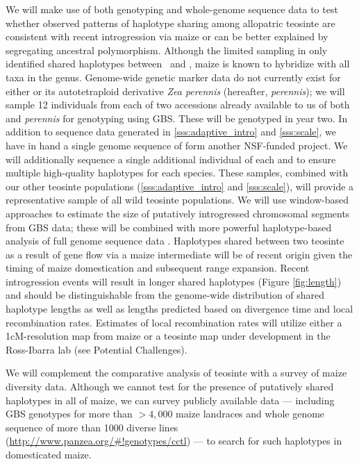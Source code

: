 We will make use of both genotyping and whole-genome sequence data to test whether observed patterns of haplotype sharing among allopatric teosinte are consistent with recent introgression via maize or can be better explained by segregating ancestral polymorphism.
Although the limited sampling in \citet{Ross-Ibarra2009a} only identified shared haplotypes between \zm\ and \zl, maize is known to hybridize with all taxa in the genus.
Genome-wide genetic marker data do not currently exist for either \zd{} or its autotetraploid derivative \emph{Zea perennis} (hereafter, \emph{perennis}); we will sample 12 individuals from each of two accessions already available to us of both \zd{} and \emph{perennis} for genotyping using GBS. 
These will be genotyped in year two.
In addition to sequence data generated in \ref{sss:adaptive_intro} and \ref{sss:scale}, we have in hand a single genome sequence of \zd form another NSF-funded project.  
We will additionally sequence a single additional individual of each \zd{} and \zl{} to ensure multiple high-quality haplotypes for each species.
These samples, combined with our other teosinte populations (\ref{sss:adaptive_intro} and \ref{sss:scale}), will provide a representative sample of all wild teosinte populations.
We will use window-based approaches \citep[e.g.,][]{martin2015evaluating} to estimate the size of putatively introgressed chromosomal segments from GBS data; these will be combined with more powerful haplotype-based analysis of full genome sequence data \citep{price2009}.  
Haplotypes shared between two teosinte as a result of gene flow via a maize intermediate will be of recent origin given the timing of maize domestication and subsequent range expansion. 
Recent introgression events will result in longer shared haplotypes (Figure \ref{fig:length}) and should be distinguishable from the genome-wide distribution of shared haplotype lengths as well as lengths predicted based on divergence time and local recombination rates.  
Estimates of local recombination rates will utilize either a 1cM-resolution map from maize \citep{wallace2014association} or a teosinte map under development in the Ross-Ibarra lab (see Potential Challenges).

We will complement the comparative analysis of teosinte with a survey of maize diversity data.
Although we cannot test for the presence of putatively shared haplotypes in all of maize, we can survey publicly available data --- including GBS genotypes for more than $>4,000$ maize landraces \citep{Hearne2015} and whole genome sequence of more than 1000 diverse lines (\url{http://www.panzea.org/#!genotypes/cctl}) --- to search for such haplotypes in domesticated maize.

